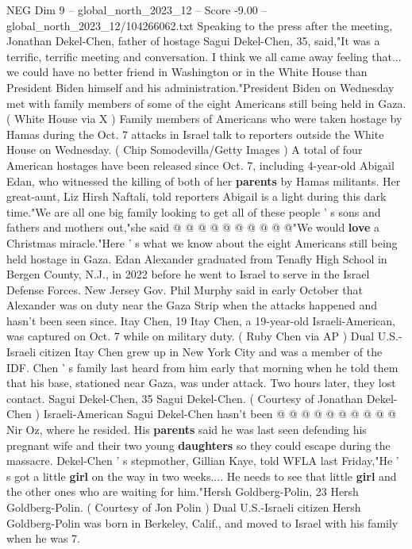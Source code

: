 \begin{textsample}{NEG Dim 9 – global\_north\_2023\_12 – Score -9.00 – global\_north\_2023\_12/104266062.txt}  \label{ex:f9_neg_072}
Speaking to the press after the meeting, Jonathan Dekel-Chen, father of hostage Sagui Dekel-Chen, 35, said,"It was a terrific, terrific meeting and conversation.
I think we all came away feeling that... we could have no better friend in Washington or in the White House than President Biden himself and his administration."President Biden on Wednesday met with family members of some of the eight Americans still being held in Gaza. ( White House via X ) Family members of Americans who were taken hostage by Hamas during the Oct. 7 attacks in Israel talk to reporters outside the White House on Wednesday. ( Chip Somodevilla/Getty Images ) A total of four American hostages have been released since Oct. 7, including 4-year-old Abigail Edan, who witnessed the killing of both of her \textbf{parents} by Hamas militants.
Her great-aunt, Liz Hirsh Naftali, told reporters Abigail is a light during this dark time."We are all one big family looking to get all of these people ' s sons and fathers and mothers out,"she said @ @ @ @ @ @ @ @ @ @"We would \textbf{love} a Christmas miracle."Here ' s what we know about the eight Americans still being held hostage in Gaza.
Edan Alexander graduated from Tenafly High School in Bergen County, N.J., in 2022 before he went to Israel to serve in the Israel Defense Forces.
New Jersey Gov.
Phil Murphy said in early October that Alexander was on duty near the Gaza Strip when the attacks happened and hasn't been seen since.
Itay Chen, 19 Itay Chen, a 19-year-old Israeli-American, was captured on Oct. 7 while on military duty. ( Ruby Chen via AP ) Dual U.S.-Israeli citizen Itay Chen grew up in New York City and was a member of the IDF.
Chen ' s family last heard from him early that morning when he told them that his base, stationed near Gaza, was under attack.
Two hours later, they lost contact.
Sagui Dekel-Chen, 35 Sagui Dekel-Chen. ( Courtesy of Jonathan Dekel-Chen ) Israeli-American Sagui Dekel-Chen hasn't been @ @ @ @ @ @ @ @ @ @ Nir Oz, where he resided.
His \textbf{parents} said he was last seen defending his pregnant wife and their two young \textbf{daughters} so they could escape during the massacre.
Dekel-Chen ' s stepmother, Gillian Kaye, told WFLA last Friday,"He ' s got a little \textbf{girl} on the way in two weeks....
He needs to see that little \textbf{girl} and the other ones who are waiting for him."Hersh Goldberg-Polin, 23 Hersh Goldberg-Polin. ( Courtesy of Jon Polin ) Dual U.S.-Israeli citizen Hersh Goldberg-Polin was born in Berkeley, Calif., and moved to Israel with his family when he was 7.

\end{textsample}
